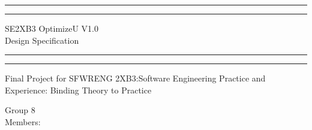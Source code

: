 \documentclass[12pt]{article}
\begin{document}
\begin{titlepage} %

	\centering %
	
	\scshape %
	
	\vspace*{\baselineskip} %
	
	
	\rule{\textwidth}{1.6pt}\vspace*{-\baselineskip}\vspace*{2pt} %
	\rule{\textwidth}{0.4pt} %
	
	\vspace{0.75\baselineskip} %
	
	{\LARGE SE2XB3 OptimizeU V1.0 \\ Design Specification\\} %
	
	\vspace{0.75\baselineskip} %
	
	\rule{\textwidth}{0.4pt}\vspace*{-\baselineskip}\vspace{3.2pt} %
	\rule{\textwidth}{1.6pt} %
	
	\vspace{2\baselineskip} %
	
	
	Final Project for SFWRENG 2XB3:Software Engineering Practice and Experience: 
	Binding Theory to Practice
	
	\vspace*{3\baselineskip} %
	
	
	Group 8\\ Members:\\
	
	\vspace{0.5\baselineskip}
	

\end{titlepage}
\end{document}

